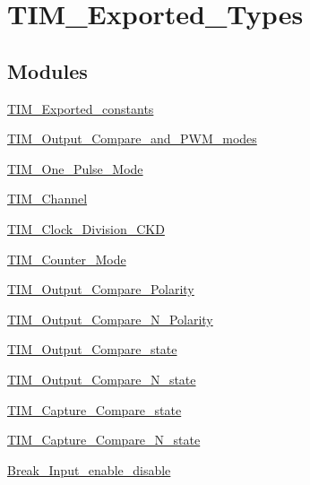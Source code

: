 \hypertarget{group___t_i_m___exported___types}{}\section{T\+I\+M\+\_\+\+Exported\+\_\+\+Types}
\label{group___t_i_m___exported___types}
\subsection*{Modules}
\begin{DoxyCompactItemize}
\item 
\hyperlink{group___t_i_m___exported__constants}{T\+I\+M\+\_\+\+Exported\+\_\+constants}
\item 
\hyperlink{group___t_i_m___output___compare__and___p_w_m__modes}{T\+I\+M\+\_\+\+Output\+\_\+\+Compare\+\_\+and\+\_\+\+P\+W\+M\+\_\+modes}
\item 
\hyperlink{group___t_i_m___one___pulse___mode}{T\+I\+M\+\_\+\+One\+\_\+\+Pulse\+\_\+\+Mode}
\item 
\hyperlink{group___t_i_m___channel}{T\+I\+M\+\_\+\+Channel}
\item 
\hyperlink{group___t_i_m___clock___division___c_k_d}{T\+I\+M\+\_\+\+Clock\+\_\+\+Division\+\_\+\+C\+KD}
\item 
\hyperlink{group___t_i_m___counter___mode}{T\+I\+M\+\_\+\+Counter\+\_\+\+Mode}
\item 
\hyperlink{group___t_i_m___output___compare___polarity}{T\+I\+M\+\_\+\+Output\+\_\+\+Compare\+\_\+\+Polarity}
\item 
\hyperlink{group___t_i_m___output___compare___n___polarity}{T\+I\+M\+\_\+\+Output\+\_\+\+Compare\+\_\+\+N\+\_\+\+Polarity}
\item 
\hyperlink{group___t_i_m___output___compare__state}{T\+I\+M\+\_\+\+Output\+\_\+\+Compare\+\_\+state}
\item 
\hyperlink{group___t_i_m___output___compare___n__state}{T\+I\+M\+\_\+\+Output\+\_\+\+Compare\+\_\+\+N\+\_\+state}
\item 
\hyperlink{group___t_i_m___capture___compare__state}{T\+I\+M\+\_\+\+Capture\+\_\+\+Compare\+\_\+state}
\item 
\hyperlink{group___t_i_m___capture___compare___n__state}{T\+I\+M\+\_\+\+Capture\+\_\+\+Compare\+\_\+\+N\+\_\+state}
\item 
\hyperlink{group___break___input__enable__disable}{Break\+\_\+\+Input\+\_\+enable\+\_\+disable}
\item 

\end{DoxyCompactItemize}
